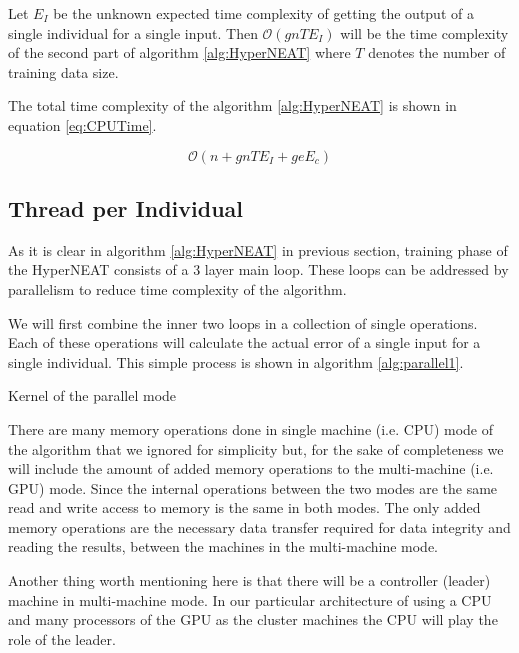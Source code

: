 \documentclass[twocolumn]{article}
\begin{document}
Let $E_I$ be the unknown expected time complexity of getting the output of a single individual for a single input. Then $\mathcal{O}(gnTE_I)$ will be the time complexity of the second part of algorithm \ref{alg:HyperNEAT} where $T$ denotes the number of training data size.

The total time complexity of the algorithm \ref{alg:HyperNEAT} is shown in equation \ref{eq:CPUTime}.

\begin{equation}
    \label{eq:CPUTime}
    \mathcal{O}(n+gnTE_I+geE_c)
\end{equation}

\subsection{Thread per Individual}

As it is clear in algorithm \ref{alg:HyperNEAT} in previous section, training phase of the HyperNEAT consists of a 3 layer main loop. These loops can be addressed by parallelism to reduce time complexity of the algorithm.

We will first combine the inner two loops in a collection of single operations. Each of these operations will calculate the actual error of a single input for a single individual. This simple process is shown in algorithm \ref{alg:parallel1}.

\begin{algorithm}
    \caption{Kernel of the parallel mode}
    \label{alg:parallel1}
    \begin{algorithmic}
    \end{algorithmic}
\end{algorithm}

There are many memory operations done in single machine (i.e. CPU) mode of the algorithm that we ignored for simplicity but, for the sake of completeness we will include the amount of added memory operations to the multi-machine (i.e. GPU) mode. Since the internal operations between the two modes are the same read and write access to memory is the same in both modes. The only added memory operations are the necessary data transfer required for data integrity and reading the results, between the machines in the multi-machine mode.

Another thing worth mentioning here is that there will be a controller (leader) machine in multi-machine mode. In our particular architecture of using a CPU and many processors of the GPU as the cluster machines the CPU will play the role of the leader.
\end{document}
